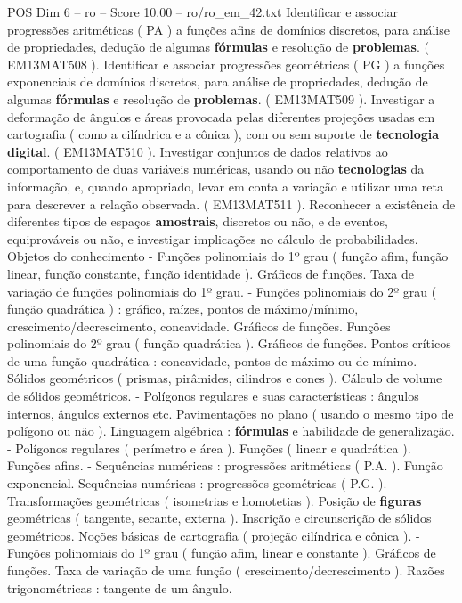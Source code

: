\begin{textsample}{POS Dim 6 – ro – Score 10.00 – ro/ro\_em\_42.txt}
Identificar e associar progressões aritméticas ( PA ) a funções afins de domínios discretos, para análise de propriedades, dedução de algumas \textbf{fórmulas} e resolução de \textbf{problemas}. ( EM13MAT508 ).
Identificar e associar progressões geométricas ( PG ) a funções exponenciais de domínios discretos, para análise de propriedades, dedução de algumas \textbf{fórmulas} e resolução de \textbf{problemas}. ( EM13MAT509 ).
Investigar a deformação de ângulos e áreas provocada pelas diferentes projeções usadas em cartografia ( como a cilíndrica e a cônica ), com ou sem suporte de \textbf{tecnologia} \textbf{digital}. ( EM13MAT510 ).
Investigar conjuntos de dados relativos ao comportamento de duas variáveis numéricas, usando ou não \textbf{tecnologias} da informação, e, quando apropriado, levar em conta a variação e utilizar uma reta para descrever a relação observada. ( EM13MAT511 ).
Reconhecer a existência de diferentes tipos de espaços \textbf{amostrais}, discretos ou não, e de eventos, equiprováveis ou não, e investigar implicações no cálculo de probabilidades.
Objetos do conhecimento - Funções polinomiais do 1º grau ( função afim, função linear, função constante, função identidade ).
Gráficos de funções.
Taxa de variação de funções polinomiais do 1º grau. - Funções polinomiais do 2º grau ( função quadrática ) : gráfico, raízes, pontos de máximo/mínimo, crescimento/decrescimento, concavidade.
Gráficos de funções.
Funções polinomiais do 2º grau ( função quadrática ).
Gráficos de funções.
Pontos críticos de uma função quadrática : concavidade, pontos de máximo ou de mínimo.
Sólidos geométricos ( prismas, pirâmides, cilindros e cones ).
Cálculo de volume de sólidos geométricos. - Polígonos regulares e suas características : ângulos internos, ângulos externos etc.
Pavimentações no plano ( usando o mesmo tipo de polígono ou não ).
Linguagem algébrica : \textbf{fórmulas} e habilidade de generalização. - Polígonos regulares ( perímetro e área ).
Funções ( linear e quadrática ).
Funções afins. - Sequências numéricas : progressões aritméticas ( P.A. ).
Função exponencial.
Sequências numéricas : progressões geométricas ( P.G. ).
Transformações geométricas ( isometrias e homotetias ).
Posição de \textbf{figuras} geométricas ( tangente, secante, externa ).
Inscrição e circunscrição de sólidos geométricos.
Noções básicas de cartografia ( projeção cilíndrica e cônica ). - Funções polinomiais do 1º grau ( função afim, linear e constante ).
Gráficos de funções.
Taxa de variação de uma função ( crescimento/decrescimento ).
Razões trigonométricas : tangente de um ângulo.

\end{textsample}
